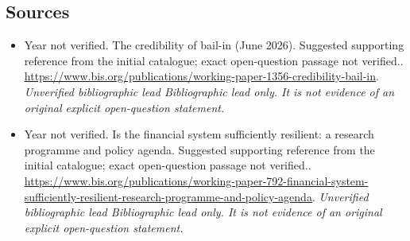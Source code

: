 \documentclass[11pt]{article}
\begin{document}
\subsection{Sources}
\begin{itemize}\raggedright
\item[\textnormal{[S1]}]\hypertarget{source:30007609:1}{} Year not verified. The credibility of bail-in (June 2026). Suggested supporting reference from the initial catalogue; exact open-question passage not verified..
\url{https://www.bis.org/publications/working-paper-1356-credibility-bail-in}.
{\small\textit{Unverified bibliographic lead Bibliographic lead only. It is not evidence of an original explicit open-question statement.}}

\item[\textnormal{[S2]}]\hypertarget{source:30007609:2}{} Year not verified. Is the financial system sufficiently resilient: a research programme and policy agenda. Suggested supporting reference from the initial catalogue; exact open-question passage not verified..
\url{https://www.bis.org/publications/working-paper-792-financial-system-sufficiently-resilient-research-programme-and-policy-agenda}.
{\small\textit{Unverified bibliographic lead Bibliographic lead only. It is not evidence of an original explicit open-question statement.}}
\end{itemize}
\end{document}
